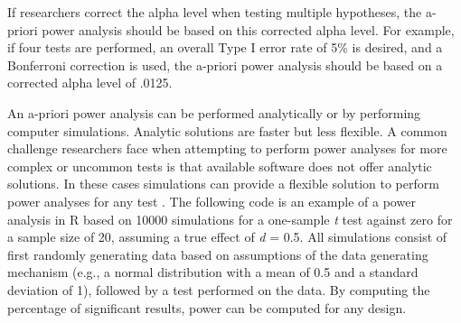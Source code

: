 \documentclass[
  oneside]{krantz}
\makeatletter
\newenvironment{Shaded}{\begin{snugshade}}{\end{snugshade}}
\newcommand{\AttributeTok}[1]{\textcolor[rgb]{0.61,0.61,0.61}{#1}}
\newcommand{\CommentTok}[1]{\textcolor[rgb]{0.37,0.37,0.37}{\textit{#1}}}
\newcommand{\ControlFlowTok}[1]{\textcolor[rgb]{0.27,0.27,0.27}{\textbf{#1}}}
\newcommand{\DecValTok}[1]{\textcolor[rgb]{0.06,0.06,0.06}{#1}}
\newcommand{\FloatTok}[1]{\textcolor[rgb]{0.06,0.06,0.06}{#1}}
\newcommand{\FunctionTok}[1]{\textcolor[rgb]{0,0,0}{#1}}
\newcommand{\NormalTok}[1]{#1}
\newcommand{\OtherTok}[1]{\textcolor[rgb]{0.37,0.37,0.37}{#1}}
\newcommand{\SpecialCharTok}[1]{\textcolor[rgb]{0,0,0}{#1}}
\newenvironment{kframe}{%
\medskip{}
\setlength{\fboxsep}{.8em}
 \def\at@end@of@kframe{}%
 \ifinner\ifhmode%
  \def\at@end@of@kframe{\end{minipage}}%
  \begin{minipage}{\columnwidth}%
 \fi\fi%
 \def\FrameCommand##1{\hskip\@totalleftmargin \hskip-\fboxsep
 \colorbox{shadecolor}{##1}\hskip-\fboxsep
     \hskip-\linewidth \hskip-\@totalleftmargin \hskip\columnwidth}%
 \MakeFramed {\advance\hsize-\width
   \@totalleftmargin\z@ \linewidth\hsize
   \@setminipage}}%
 {\par\unskip\endMakeFramed%
 \at@end@of@kframe}
\renewenvironment{Shaded}{\begin{kframe}}{\end{kframe}}
\makeatother
\begin{document}
If researchers correct the alpha level when testing multiple hypotheses, the a-priori power analysis should be based on this corrected alpha level. For example, if four tests are performed, an overall Type I error rate of 5\% is desired, and a Bonferroni correction is used, the a-priori power analysis should be based on a corrected alpha level of .0125.

An a-priori power analysis can be performed analytically or by performing computer simulations. Analytic solutions are faster but less flexible. A common challenge researchers face when attempting to perform power analyses for more complex or uncommon tests is that available software does not offer analytic solutions. In these cases simulations can provide a flexible solution to perform power analyses for any test \citep{morris_using_2019}. The following code is an example of a power analysis in R based on 10000 simulations for a one-sample \emph{t} test against zero for a sample size of 20, assuming a true effect of \emph{d} = 0.5. All simulations consist of first randomly generating data based on assumptions of the data generating mechanism (e.g., a normal distribution with a mean of 0.5 and a standard deviation of 1), followed by a test performed on the data. By computing the percentage of significant results, power can be computed for any design.

\begin{Shaded}
\end{Shaded}
\end{document}
